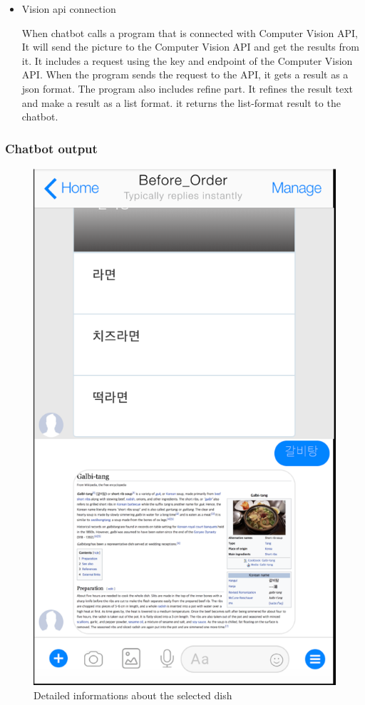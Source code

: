 \begin{itemize}
\item Vision api connection

When chatbot calls a program that is connected with Computer Vision API, It will send the picture to the Computer Vision API and get the results from it. It includes a request using the key and endpoint of the Computer Vision API. When the program sends the request to the API, it gets a result as a json format. The program also includes refine part. It refines the result text and make a result as a list format.  it returns the list-format result to the chatbot.
\end{itemize}
\FloatBarrier

\subsubsection{Chatbot output}

\begin{figure}[htbp]
\centerline{\includegraphics[height=\custompicheight]{./pictures/facebook_dish_information}}
\caption{Detailed informations about the selected dish}
\label{fig:facebook_dish_information}
\end{figure}
\FloatBarrier

